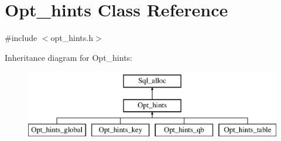 \hypertarget{classOpt__hints}{}\section{Opt\+\_\+hints Class Reference}
\label{classOpt__hints}


{\ttfamily \#include $<$opt\+\_\+hints.\+h$>$}

Inheritance diagram for Opt\+\_\+hints\+:\begin{figure}[H]
\begin{center}
\leavevmode
\includegraphics[height=3.000000cm]{classOpt__hints}
\end{center}
\end{figure}

